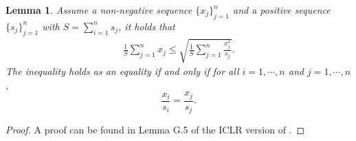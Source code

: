 \documentclass{article}
\newtheorem{lemma}{Lemma}
\theoremstyle{remark}
\begin{document}
\begin{lemma}\label{lem:useful_inequality_diagonal}
    Assume a non-negative sequence $\{x_j\}_{j=1}^n$ and a positive sequence $\{s_j\}_{j=1}^n$ with $S=\sum_{i=1}^ns_j$, it holds that
    \begin{align}\label{eq:lem_useful_inequality_diagonal}
        \frac{1}{S}\sum_{j=1}^n x_j \le \sqrt{\frac{1}{S}\sum_{j=1}^n \frac{x_j^2}{s_j}}.
    \end{align}
    The inequality holds as an equality if and only if for all $i=1,\cdots,n$ and $j=1,\cdots,n$, $$\frac{x_i}{s_i}=\frac{x_j}{s_j}.$$
\end{lemma}
\begin{proof}
    A proof can be found in Lemma G.5 of the ICLR version of \citet{liu2024adagrad}.
\end{proof}
\end{document}
